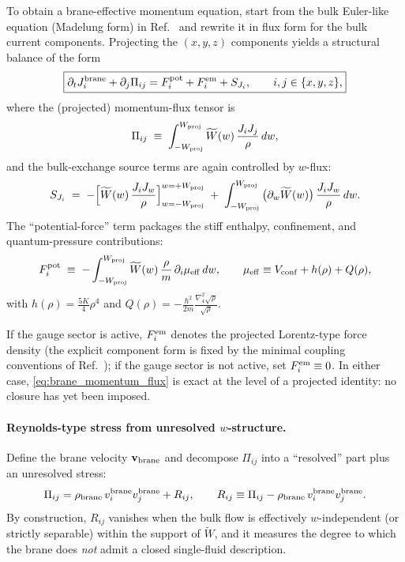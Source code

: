 \documentclass[11pt]{article}
\begin{document}
To obtain a brane-effective momentum equation, start from the bulk Euler-like
equation (Madelung form) in Ref.~\cite{norris2026_4d_model} and rewrite it in flux form for the bulk
current components.  Projecting the $(x,y,z)$ components yields a structural
balance of the form
\begin{align}
\boxed{
\partial_t J^{\rm brane}_i + \partial_j \Pi_{ij} = F^{\rm pot}_i + F^{\rm em}_i + S_{J_i},
\qquad i,j\in\{x,y,z\},
}
\label{eq:brane_momentum_flux}
\end{align}
where the (projected) momentum-flux tensor is
\begin{align}
\Pi_{ij}
\;\equiv\;
\int_{-W_{\rm proj}}^{W_{\rm proj}} \widetilde W(w)\,\frac{J_iJ_j}{\rho}\,dw,
\label{eq:Pi_def}
\end{align}
and the bulk-exchange source terms are again controlled by $w$-flux:
\begin{align}
S_{J_i}
\;=\;
-\Big[\widetilde W(w)\,\frac{J_iJ_w}{\rho}\Big]_{w=-W_{\rm proj}}^{w=+W_{\rm proj}}
\;+\;
\int_{-W_{\rm proj}}^{W_{\rm proj}} \big(\partial_w \widetilde W(w)\big)\,\frac{J_iJ_w}{\rho}\,dw.
\label{eq:brane_momentum_leak}
\end{align}
The ``potential-force'' term packages the stiff enthalpy, confinement, and
quantum-pressure contributions:
\begin{align}
F^{\rm pot}_i
\;\equiv\;
-\int_{-W_{\rm proj}}^{W_{\rm proj}}
\widetilde W(w)\,\frac{\rho}{m}\,\partial_i\mu_{\rm eff}\,dw,
\qquad
\mu_{\rm eff}\equiv V_{\rm conf}+h(\rho)+Q(\rho),
\label{eq:Fpot_def}
\end{align}
with $h(\rho)=\frac{5K}{4}\rho^4$ and $Q(\rho)=-\frac{\hbar^2}{2m}
\frac{\nabla_4^2\sqrt{\rho}}{\sqrt{\rho}}$.

If the gauge sector is active, $F^{\rm em}_i$ denotes the projected Lorentz-type
force density (the explicit component form is fixed by the minimal coupling
conventions of Ref.~\cite{norris2026_4d_model}); if the gauge sector is not active, set
$F^{\rm em}_i\equiv 0$.  In either case, \eqref{eq:brane_momentum_flux} is exact
at the level of a projected identity: no closure has yet been imposed.

\paragraph{Reynolds-type stress from unresolved $w$-structure.}
Define the brane velocity $\mathbf{v}_{\rm brane}$ and decompose
$\Pi_{ij}$ into a ``resolved'' part plus an unresolved stress:
\begin{align}
\Pi_{ij} = \rho_{\rm brane}\,v^{\rm brane}_i v^{\rm brane}_j + R_{ij},
\qquad
R_{ij}\equiv \Pi_{ij}-\rho_{\rm brane}\,v^{\rm brane}_i v^{\rm brane}_j.
\label{eq:Rij_def}
\end{align}
By construction, $R_{ij}$ vanishes when the bulk flow is effectively
$w$-independent (or strictly separable) within the support of $\widetilde W$,
and it measures the degree to which the brane does \emph{not} admit a closed
single-fluid description.
\end{document}
